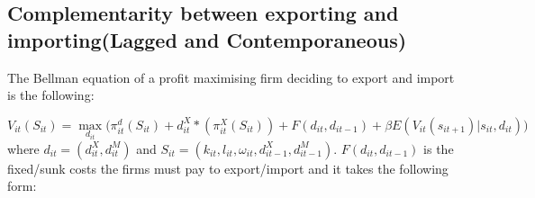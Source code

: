 \documentclass[12pt]{article}
\begin{document}
% 
% 

\subsection{Complementarity between exporting and importing(Lagged and
Contemporaneous)}\label{sec:biprobit}

The Bellman equation of a profit maximising firm deciding to export
and import is the following:  

\begin{equation}
V_{it}(S_{it}) = \underset{d_{it}}{\max} \big(\pi_{it}^{d}(S_{it}) +d_{it}^{X}*(\pi_{it}^{X}(S_{it})) +
F(d_{it}, d_{it-1}) + \beta E(V_{it}(s_{it+1})|s_{it}, d_{it}) \big)
\end{equation}
where $d_{it}= (d_{it}^X, d_{it}^M)$ and $S_{it}= (k_{it}, l_{it},
\omega_{it}, d_{it-1}^X, d_{it-1}^M)$.  $F(d_{it}, d_{it-1})$ is the
fixed/sunk costs the firms must pay to export/import and it takes the
following form:
\end{document}
